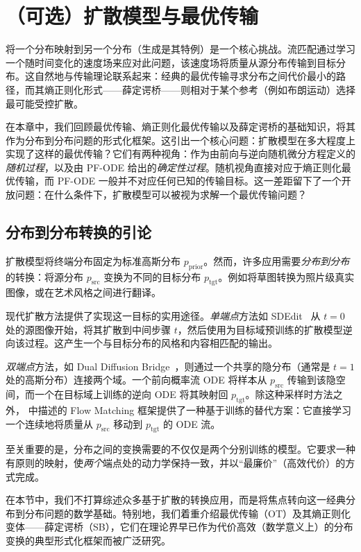 \chapter{（可选）扩散模型与最优传输}\label{ch:ot-eot}



将一个分布映射到另一个分布（生成是其特例）是一个核心挑战。流匹配通过学习一个随时间变化的速度场来应对此问题，该速度场将质量从源分布传输到目标分布。这自然地与传输理论联系起来：经典的最优传输寻求分布之间代价最小的路径，而其熵正则化形式——薛定谔桥——则相对于某个参考（例如布朗运动）选择最可能受控扩散。

在本章中，我们回顾最优传输、熵正则化最优传输以及薛定谔桥的基础知识，将其作为分布到分布问题的形式化框架。这引出一个核心问题：扩散模型在多大程度上实现了这样的最优传输？它们有两种视角：作为由前向与逆向随机微分方程定义的\emph{随机过程}，以及由 PF-ODE 给出的\emph{确定性过程}。随机视角直接对应于熵正则化最优传输，而 PF-ODE 一般并不对应任何已知的传输目标。这一差距留下了一个开放问题：在什么条件下，扩散模型可以被视为求解一个最优传输问题？




\newpage
\section{分布到分布转换的引论}
扩散模型将终端分布固定为标准高斯分布 $p_{\mathrm{prior}}$。然而，许多应用需要\emph{分布到分布}的转换：将源分布 $p_{\mathrm{src}}$ 变换为不同的目标分布 $p_{\mathrm{tgt}}$。例如将草图转换为照片级真实图像，或在艺术风格之间进行翻译。

现代扩散方法提供了实现这一目标的实用途径。\emph{单端点}方法如 SDEdit~\citep{meng2021sdedit} 从 $t=0$ 处的源图像开始，将其扩散到中间步骤 $t$，然后使用为目标域预训练的扩散模型逆向该过程。这产生一个与目标分布的风格和内容相匹配的输出。

\emph{双端点}方法，如 Dual Diffusion Bridge~\citep{su2022dual}，则通过一个共享的隐分布（通常是 $t=1$ 处的高斯分布）连接两个域。一个前向概率流 ODE 将样本从 $p_{\mathrm{src}}$ 传输到该隐空间，而一个在目标域上训练的逆向 ODE 将其映射回 $p_{\mathrm{tgt}}$。除这种采样时方法之外， 中描述的 Flow Matching 框架提供了一种基于训练的替代方案：它直接学习一个连续地将质量从 $p_{\mathrm{src}}$ 移动到 $p_{\mathrm{tgt}}$ 的 ODE 流。

至关重要的是，分布之间的变换需要的不仅仅是两个分别训练的模型。它要求一种有原则的映射，使\emph{两个}端点处的动力学保持一致，并以“最廉价”（高效代价）的方式完成。

在本节中，我们不打算综述众多基于扩散的转换应用，而是将焦点转向这一经典分布到分布问题的数学基础。特别地，我们着重介绍最优传输（OT）及其熵正则化变体——薛定谔桥（SB），它们在理论界早已作为代价高效（数学意义上）的分布变换的典型形式化框架而被广泛研究。




